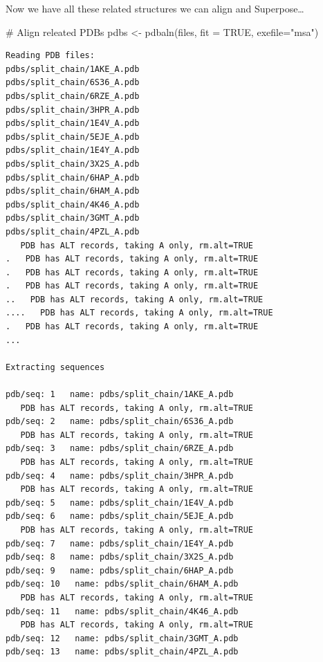 \documentclass[
  letterpaper,
  DIV=11,
  numbers=noendperiod]{scrartcl}
\newenvironment{Shaded}{\begin{snugshade}}{\end{snugshade}}
\newcommand{\AttributeTok}[1]{\textcolor[rgb]{0.40,0.45,0.13}{#1}}
\newcommand{\CommentTok}[1]{\textcolor[rgb]{0.37,0.37,0.37}{#1}}
\newcommand{\ConstantTok}[1]{\textcolor[rgb]{0.56,0.35,0.01}{#1}}
\newcommand{\FunctionTok}[1]{\textcolor[rgb]{0.28,0.35,0.67}{#1}}
\newcommand{\NormalTok}[1]{\textcolor[rgb]{0.00,0.23,0.31}{#1}}
\newcommand{\OtherTok}[1]{\textcolor[rgb]{0.00,0.23,0.31}{#1}}
\newcommand{\StringTok}[1]{\textcolor[rgb]{0.13,0.47,0.30}{#1}}
\begin{document}
Now we have all these related structures we can align and
Superpose\ldots{}

\begin{Shaded}
\begin{Highlighting}[]
\CommentTok{\# Align releated PDBs}
\NormalTok{pdbs }\OtherTok{\textless{}{-}} \FunctionTok{pdbaln}\NormalTok{(files, }\AttributeTok{fit =} \ConstantTok{TRUE}\NormalTok{, }\AttributeTok{exefile=}\StringTok{"msa"}\NormalTok{)}
\end{Highlighting}
\end{Shaded}

\begin{verbatim}
Reading PDB files:
pdbs/split_chain/1AKE_A.pdb
pdbs/split_chain/6S36_A.pdb
pdbs/split_chain/6RZE_A.pdb
pdbs/split_chain/3HPR_A.pdb
pdbs/split_chain/1E4V_A.pdb
pdbs/split_chain/5EJE_A.pdb
pdbs/split_chain/1E4Y_A.pdb
pdbs/split_chain/3X2S_A.pdb
pdbs/split_chain/6HAP_A.pdb
pdbs/split_chain/6HAM_A.pdb
pdbs/split_chain/4K46_A.pdb
pdbs/split_chain/3GMT_A.pdb
pdbs/split_chain/4PZL_A.pdb
   PDB has ALT records, taking A only, rm.alt=TRUE
.   PDB has ALT records, taking A only, rm.alt=TRUE
.   PDB has ALT records, taking A only, rm.alt=TRUE
.   PDB has ALT records, taking A only, rm.alt=TRUE
..   PDB has ALT records, taking A only, rm.alt=TRUE
....   PDB has ALT records, taking A only, rm.alt=TRUE
.   PDB has ALT records, taking A only, rm.alt=TRUE
...

Extracting sequences

pdb/seq: 1   name: pdbs/split_chain/1AKE_A.pdb 
   PDB has ALT records, taking A only, rm.alt=TRUE
pdb/seq: 2   name: pdbs/split_chain/6S36_A.pdb 
   PDB has ALT records, taking A only, rm.alt=TRUE
pdb/seq: 3   name: pdbs/split_chain/6RZE_A.pdb 
   PDB has ALT records, taking A only, rm.alt=TRUE
pdb/seq: 4   name: pdbs/split_chain/3HPR_A.pdb 
   PDB has ALT records, taking A only, rm.alt=TRUE
pdb/seq: 5   name: pdbs/split_chain/1E4V_A.pdb 
pdb/seq: 6   name: pdbs/split_chain/5EJE_A.pdb 
   PDB has ALT records, taking A only, rm.alt=TRUE
pdb/seq: 7   name: pdbs/split_chain/1E4Y_A.pdb 
pdb/seq: 8   name: pdbs/split_chain/3X2S_A.pdb 
pdb/seq: 9   name: pdbs/split_chain/6HAP_A.pdb 
pdb/seq: 10   name: pdbs/split_chain/6HAM_A.pdb 
   PDB has ALT records, taking A only, rm.alt=TRUE
pdb/seq: 11   name: pdbs/split_chain/4K46_A.pdb 
   PDB has ALT records, taking A only, rm.alt=TRUE
pdb/seq: 12   name: pdbs/split_chain/3GMT_A.pdb 
pdb/seq: 13   name: pdbs/split_chain/4PZL_A.pdb 
\end{verbatim}
\end{document}

